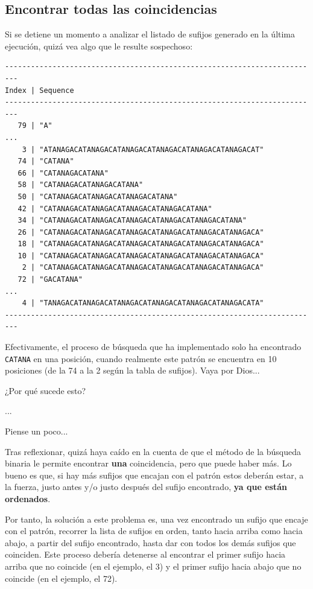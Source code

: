 \documentclass[10pt,a4paper,spanish]{article}
\newcommand{\code}[1]{\texttt{#1}}
\begin{document}
\subsection{Encontrar todas las coincidencias}

Si se detiene un momento a analizar el listado de sufijos generado en la última ejecución, quizá vea algo que le resulte sospechoso:

\begin{verbatim}
-------------------------------------------------------------------------
Index | Sequence
-------------------------------------------------------------------------
   79 | "A"
...
    3 | "ATANAGACATANAGACATANAGACATANAGACATANAGACATANAGACAT"
   74 | "CATANA"
   66 | "CATANAGACATANA"
   58 | "CATANAGACATANAGACATANA"
   50 | "CATANAGACATANAGACATANAGACATANA"
   42 | "CATANAGACATANAGACATANAGACATANAGACATANA"
   34 | "CATANAGACATANAGACATANAGACATANAGACATANAGACATANA"
   26 | "CATANAGACATANAGACATANAGACATANAGACATANAGACATANAGACA"
   18 | "CATANAGACATANAGACATANAGACATANAGACATANAGACATANAGACA"
   10 | "CATANAGACATANAGACATANAGACATANAGACATANAGACATANAGACA"
    2 | "CATANAGACATANAGACATANAGACATANAGACATANAGACATANAGACA"
   72 | "GACATANA"
...
    4 | "TANAGACATANAGACATANAGACATANAGACATANAGACATANAGACATA"
-------------------------------------------------------------------------
\end{verbatim}

Efectivamente, el proceso de búsqueda que ha implementado solo ha encontrado \code{CATANA} en una posición, cuando realmente este patrón se encuentra en 10 posiciones (de la 74 a la 2 según la tabla de sufijos). Vaya por Dios...

¿Por qué sucede esto?

\vspace{1cm}

...

\vspace{1cm}

Piense un poco...

\vspace{1cm}

Tras reflexionar, quizá haya caído en la cuenta de que el método de la búsqueda binaria le permite encontrar \textbf{una} coincidencia, pero que puede haber más. Lo bueno es que, si hay más sufijos que encajan con el patrón estos deberán estar, a la fuerza, justo antes y/o justo después del sufijo encontrado, \textbf{ya que están ordenados}.

Por tanto, la solución a este problema es, una vez encontrado un sufijo que encaje con el patrón, recorrer la lista de sufijos en orden, tanto hacia arriba como hacia abajo, a partir del sufijo encontrado, hasta dar con todos los demás sufijos que coinciden. Este proceso debería detenerse al encontrar el primer sufijo hacia arriba que no coincide (en el ejemplo, el 3) y el primer sufijo hacia abajo que no coincide (en el ejemplo, el 72).
\end{document}
